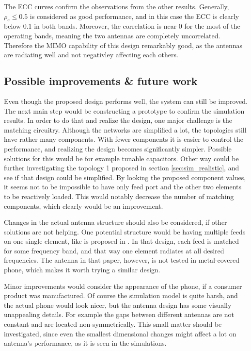 The ECC curves confirm the observations from the other results. Generally, $\rho_e\leq0.5$ is considered as good performance, and in this case the ECC is clearly below 0.1 in both bands. Moreover, the correlation is near 0 for the most of the operating bands, meaning the two antennas are completely uncorrelated. Therefore the MIMO capability of this design remarkably good, as the antennas are radiating well and not negativley affecting each others.

\subsection{Possible improvements \& future work}
\label{sec:improvements}
Even though the proposed design performs well, the system can still be improved. The next main step would be constructing a prototype to confirm the simulation results. In order to do that and realize the design, one major challenge is the matching circuitry. Although the networks are simplified a lot, the topologies still have rather many components. With fewer components it is easier to control the performance, and realizing the design becomes significantly simpler. Possible solutions for this would be for example tunable capacitors. Other way could be further investigating the topology 1 proposed in section \ref{sec:sim_realistic}, and see if that design could be simplified. By looking the proposed component values, it seems not to be impossible to have only feed port and the other two elements to be reactively loaded. This would notably decrease the number of matching components, which clearly would be an improvement.

Changes in the actual antenna structure should also be considered, if other solutions are not helping. One potential structure would be having multiple feeds on one single element, like is proposed in \cite{valkonen_multifeed}. In that design, each feed is matched for some frequency band, and that way one element radiates at all desired frequencies. The antenna in that paper, however, is not tested in metal-covered phone, which makes it worth trying a similar design.

Minor improvements would consider the appearance of the phone, if a consumer product was manufactured. Of course the simulation model is quite harsh, and the actual phone would look nicer, but the antenna design has some visually unappealing details. For example the gaps between different antennas are not constant and are located non-symmetrically. This small matter should be investigated, since even the smallest dimensional changes might affect a lot on antenna's performance, as it is seen in the simulations.

